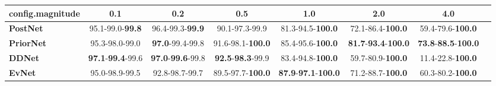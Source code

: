 \begin{tabular}{lccccccc}
\toprule
\textbf{config.magnitude} &                               0.1 &                               0.2 &                               0.5 &                                         1.0 &                                         2.0 &                                         4.0 \\
\midrule
\textbf{PostNet } &           95.1-99.0-\textbf{99.8} &           96.4-99.3-\textbf{99.9} &                    90.1-97.3-99.9 &                    81.3-94.5-\textbf{100.0} &                    72.1-86.4-\textbf{100.0} &                    59.4-79.6-\textbf{100.0} \\
\textbf{PriorNet} &                    95.3-98.0-99.0 &           \textbf{97.0}-99.4-99.8 &          91.6-98.1-\textbf{100.0} &                    85.4-95.6-\textbf{100.0} &  \textbf{81.7}-\textbf{93.4}-\textbf{100.0} &  \textbf{73.8}-\textbf{88.5}-\textbf{100.0} \\
\textbf{DDNet   } &  \textbf{97.1}-\textbf{99.4}-99.6 &  \textbf{97.0}-\textbf{99.6}-99.8 &  \textbf{92.5}-\textbf{98.3}-99.9 &                    83.4-94.8-\textbf{100.0} &                    59.7-80.9-\textbf{100.0} &                    11.4-22.8-\textbf{100.0} \\
\textbf{EvNet   } &                    95.0-98.9-99.5 &                    92.8-98.7-99.7 &          89.5-97.7-\textbf{100.0} &  \textbf{87.9}-\textbf{97.1}-\textbf{100.0} &                    71.2-88.7-\textbf{100.0} &                    60.3-80.2-\textbf{100.0} \\
\bottomrule
\end{tabular}
